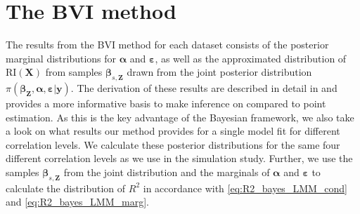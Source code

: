 \section{The BVI method}
The results from the BVI method for each dataset consists of the posterior marginal distributions for $\boldsymbol{\alpha}$ and $\boldsymbol{\varepsilon}$, as well as the approximated distribution of $\text{RI}(\mathbf{X})$ from samples $\boldsymbol{\beta}_{s, \mathbf{Z}}$ drawn from the joint posterior distribution $\pi(\boldsymbol{\beta}_{\mathbf{Z}}, \boldsymbol{\alpha}, \boldsymbol{\varepsilon} \lvert \mathbf{y})$.
The derivation of these results are described in detail in  and provides a more informative basis to make inference on compared to point estimation.
As this is the key advantage of the Bayesian framework, we also take a look on what results our method provides for a single model fit for different correlation levels. 
We calculate these posterior distributions for the same four different correlation levels as we use in the simulation study.
Further, we use the samples $\boldsymbol{\beta}_{s, \mathbf{Z}}$ from the joint distribution and the marginals of $\boldsymbol{\alpha}$ and $\boldsymbol{\varepsilon}$ to calculate the distribution of $R^2$ in accordance with \eqref{eq:R2_bayes_LMM_cond} and \eqref{eq:R2_bayes_LMM_marg}. 

